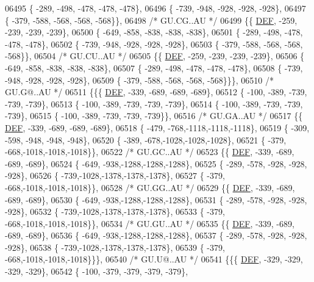 \begin{DoxyCode}
06495 \{ -289, -498, -478, -478, -478\},
06496 \{ -739, -948, -928, -928, -928\},
06497 \{ -379, -588, -568, -568, -568\}\},
06498 \textcolor{comment}{/* GU.CG..AU */}
06499 \{\{  \mbox{\hyperlink{1_88_84__epars_8h_a397419fc12b37ed479c8abb9d444d843}{DEF}}, -259, -239, -239, -239\},
06500 \{ -649, -858, -838, -838, -838\},
06501 \{ -289, -498, -478, -478, -478\},
06502 \{ -739, -948, -928, -928, -928\},
06503 \{ -379, -588, -568, -568, -568\}\},
06504 \textcolor{comment}{/* GU.CU..AU */}
06505 \{\{  \mbox{\hyperlink{1_88_84__epars_8h_a397419fc12b37ed479c8abb9d444d843}{DEF}}, -259, -239, -239, -239\},
06506 \{ -649, -858, -838, -838, -838\},
06507 \{ -289, -498, -478, -478, -478\},
06508 \{ -739, -948, -928, -928, -928\},
06509 \{ -379, -588, -568, -568, -568\}\}\},
06510 \textcolor{comment}{/* GU.G@..AU */}
06511 \{\{\{  \mbox{\hyperlink{1_88_84__epars_8h_a397419fc12b37ed479c8abb9d444d843}{DEF}}, -339, -689, -689, -689\},
06512 \{ -100, -389, -739, -739, -739\},
06513 \{ -100, -389, -739, -739, -739\},
06514 \{ -100, -389, -739, -739, -739\},
06515 \{ -100, -389, -739, -739, -739\}\},
06516 \textcolor{comment}{/* GU.GA..AU */}
06517 \{\{  \mbox{\hyperlink{1_88_84__epars_8h_a397419fc12b37ed479c8abb9d444d843}{DEF}}, -339, -689, -689, -689\},
06518 \{ -479, -768,-1118,-1118,-1118\},
06519 \{ -309, -598, -948, -948, -948\},
06520 \{ -389, -678,-1028,-1028,-1028\},
06521 \{ -379, -668,-1018,-1018,-1018\}\},
06522 \textcolor{comment}{/* GU.GC..AU */}
06523 \{\{  \mbox{\hyperlink{1_88_84__epars_8h_a397419fc12b37ed479c8abb9d444d843}{DEF}}, -339, -689, -689, -689\},
06524 \{ -649, -938,-1288,-1288,-1288\},
06525 \{ -289, -578, -928, -928, -928\},
06526 \{ -739,-1028,-1378,-1378,-1378\},
06527 \{ -379, -668,-1018,-1018,-1018\}\},
06528 \textcolor{comment}{/* GU.GG..AU */}
06529 \{\{  \mbox{\hyperlink{1_88_84__epars_8h_a397419fc12b37ed479c8abb9d444d843}{DEF}}, -339, -689, -689, -689\},
06530 \{ -649, -938,-1288,-1288,-1288\},
06531 \{ -289, -578, -928, -928, -928\},
06532 \{ -739,-1028,-1378,-1378,-1378\},
06533 \{ -379, -668,-1018,-1018,-1018\}\},
06534 \textcolor{comment}{/* GU.GU..AU */}
06535 \{\{  \mbox{\hyperlink{1_88_84__epars_8h_a397419fc12b37ed479c8abb9d444d843}{DEF}}, -339, -689, -689, -689\},
06536 \{ -649, -938,-1288,-1288,-1288\},
06537 \{ -289, -578, -928, -928, -928\},
06538 \{ -739,-1028,-1378,-1378,-1378\},
06539 \{ -379, -668,-1018,-1018,-1018\}\}\},
06540 \textcolor{comment}{/* GU.U@..AU */}
06541 \{\{\{  \mbox{\hyperlink{1_88_84__epars_8h_a397419fc12b37ed479c8abb9d444d843}{DEF}}, -329, -329, -329, -329\},
06542 \{ -100, -379, -379, -379, -379\},

\end{DoxyCode}
